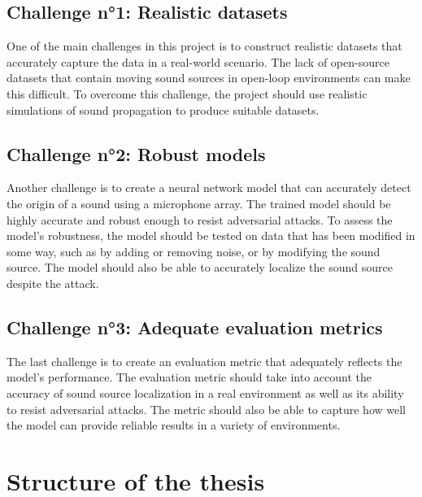 \subsection{Challenge n°1: Realistic datasets}

One of the main challenges in this project is to construct realistic datasets that accurately capture the data in a real-world scenario. The lack of open-source datasets that contain moving sound sources in open-loop environments can make this difficult. To overcome this challenge, the project should use realistic simulations of sound propagation to produce suitable datasets.

\subsection{Challenge n°2: Robust models}

Another challenge is to create a neural network model that can accurately detect the origin of a sound using a microphone array. The trained model should be highly accurate and robust enough to resist adversarial attacks. To assess the model's robustness, the model should be tested on data that has been modified in some way, such as by adding or removing noise, or by modifying the sound source. The model should also be able to accurately localize the sound source despite the attack.

\subsection{Challenge n°3: Adequate evaluation metrics}

The last challenge is to create an evaluation metric that adequately reflects the model's performance. The evaluation metric should take into account the accuracy of sound source localization in a real environment as well as its ability to resist adversarial attacks. The metric should also be able to capture how well the model can provide reliable results in a variety of environments.
\section{Structure of the thesis}


